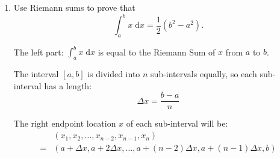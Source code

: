 \documentclass[12pt]{article}
\begin{document}
\begin{enumerate}
    \item Use Riemann sums to prove that $$\int_{a}^b x \; \mathrm{d}x = \frac{1}{2}(b^{2}-a^{2}).$$\par
    The left part: $\int_{a}^b x \; \mathrm{d}x$ is equal to the Riemann Sum of $x$ from $a$ to $b$. \par
    The interval $\left[a, b\right]$ is divided into $n$ sub-intervals equally, so each sub-interval has a length: $$\Delta x = \frac{b-a}{n}$$
    
    The right endpoint location $x$ of each sub-interval will be:
    \begin{align*}
        & \left(x_1, x_2,\dots, x_{n-2}, x_{n-1}, x_n\right)\\
        =& \left(a+\Delta x, a+2\Delta x,\dots, a+\left(n-2\right)\Delta x, a+\left(n-1\right)\Delta x, b \right)
    \end{align*}


\end{enumerate}
\end{document}
